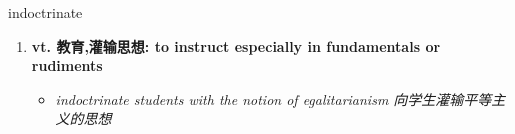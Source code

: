 
\begin{frame}
{\huge indoctrinate}
\begin{center}
\begin{enumerate}\Large
  \item \textbf{vt. 教育,灌输思想: to instruct especially in fundamentals or rudiments}
  \begin{itemize}
    \item \em{\Large{indoctrinate students with the notion of egalitarianism 向学生灌输平等主义的思想}}
  \end{itemize}
\end{enumerate}
\end{center}
\end{frame}

